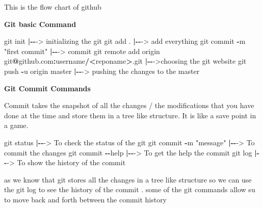\documentclass[
]{article}
\newenvironment{Shaded}{\begin{snugshade}}{\end{snugshade}}
\newcommand{\ErrorTok}[1]{\textcolor[rgb]{0.64,0.00,0.00}{\textbf{#1}}}
\newcommand{\NormalTok}[1]{#1}
\newcommand{\OtherTok}[1]{\textcolor[rgb]{0.56,0.35,0.01}{#1}}
\newcommand{\SpecialCharTok}[1]{\textcolor[rgb]{0.81,0.36,0.00}{\textbf{#1}}}
\newcommand{\StringTok}[1]{\textcolor[rgb]{0.31,0.60,0.02}{#1}}
\begin{document}
This is the flow chart of github

\textbf{Git basic Command}

\begin{Shaded}
\begin{Highlighting}[]
\NormalTok{git init                     }\SpecialCharTok{|{-}{-}}\OtherTok{{-}\textgreater{}}\NormalTok{ initializing the git}
\NormalTok{git add .                    }\SpecialCharTok{|{-}{-}}\OtherTok{{-}\textgreater{}}\NormalTok{ add everything}
\NormalTok{git commit }\SpecialCharTok{{-}}\NormalTok{m }\StringTok{"first commit"} \SpecialCharTok{|{-}{-}}\OtherTok{{-}\textgreater{}}\NormalTok{ commit }
\NormalTok{git remote add origin git}\SpecialCharTok{@}\NormalTok{github.com}\SpecialCharTok{:}\NormalTok{username}\SpecialCharTok{/}\ErrorTok{\textless{}}\NormalTok{reponame}\SpecialCharTok{\textgreater{}}\NormalTok{.git }\SpecialCharTok{|{-}{-}}\OtherTok{{-}\textgreater{}}\NormalTok{choosing the git website}
\NormalTok{git push }\SpecialCharTok{{-}}\NormalTok{u origin master   }\SpecialCharTok{|{-}{-}}\OtherTok{{-}\textgreater{}}\NormalTok{ pushing the changes to the master }
\end{Highlighting}
\end{Shaded}

\textbf{Git Commit Commands}

Commit takes the snapshot of all the changes / the modifications that
you have done at the time and store them in a tree like structure. It is
like a save point in a game.

\begin{Shaded}
\begin{Highlighting}[]
\NormalTok{git status                 }\SpecialCharTok{|{-}{-}}\OtherTok{{-}\textgreater{}}\NormalTok{ To check the status of the git}
\NormalTok{git commit }\SpecialCharTok{{-}}\NormalTok{m }\StringTok{"message"}    \SpecialCharTok{|{-}{-}}\OtherTok{{-}\textgreater{}}\NormalTok{ To commit the changes}
\NormalTok{git commit }\SpecialCharTok{{-}{-}}\NormalTok{help          }\SpecialCharTok{|{-}{-}}\OtherTok{{-}\textgreater{}}\NormalTok{ To get the help  the commit}
\NormalTok{git log                    }\SpecialCharTok{|{-}{-}}\OtherTok{{-}\textgreater{}}\NormalTok{ To show the history of the commit }
\end{Highlighting}
\end{Shaded}

as we know that git stores all the changes in a tree like structure so
we can use the git log to see the history of the commit . some of the
git commands allow su to move back and forth between the commit history
\end{document}
